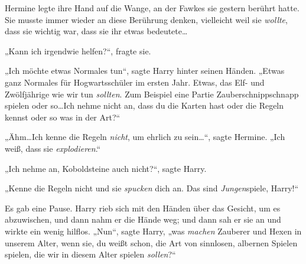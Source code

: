 Hermine legte ihre Hand auf die Wange, an der Fawkes sie gestern berührt hatte. Sie musste immer wieder an diese Berührung denken, vielleicht weil sie \emph{wollte}, dass sie wichtig war, dass sie ihr etwas bedeutete…

„Kann ich irgendwie helfen?“, fragte sie.

„Ich möchte etwas Normales tun“, sagte Harry hinter seinen Händen. „Etwas ganz Normales für Hogwartsschüler im ersten Jahr. Etwas, das Elf- und Zwölfjährige wie wir tun \emph{sollten}. Zum Beispiel eine Partie Zauberschnippschnapp spielen oder so…Ich nehme nicht an, dass du die Karten hast oder die Regeln kennst oder so was in der Art?“

„Ähm…Ich kenne die Regeln \emph{nicht}, um ehrlich zu sein…“, sagte Hermine. „Ich weiß, dass sie \emph{explodieren}.“

„Ich nehme an, Koboldsteine auch nicht?“, sagte Harry.

„Kenne die Regeln nicht und sie \emph{spucken} dich an. Das sind \emph{Jungen}{}spiele, Harry!“

Es gab eine Pause. Harry rieb sich mit den Händen über das Gesicht, um es abzuwischen, und dann nahm er die Hände weg; und dann sah er sie an und wirkte ein wenig hilflos. „Nun“, sagte Harry, „was \emph{machen} Zauberer und Hexen in unserem Alter, wenn sie, du weißt schon, die Art von sinnlosen, albernen Spielen spielen, die wir in diesem Alter spielen \emph{sollen}?“

